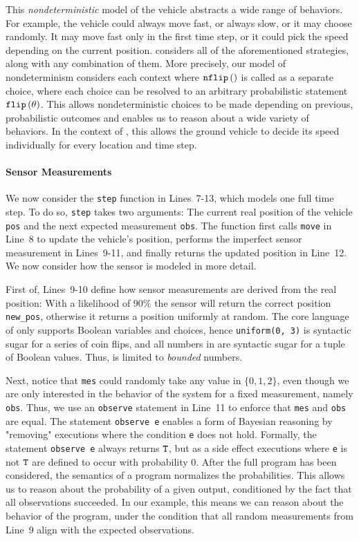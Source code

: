 This \textit{nondeterministic} model of the vehicle abstracts a wide range of behaviors.
For example, the vehicle could always move fast, or always slow, or it may choose randomly.
It may move fast only in the first time step, or it could pick the speed depending on the current position. 
\NDICE considers all of the aforementioned strategies, along with any combination of them. 
More precisely, our model of nondeterminism considers each context where $\texttt{nflip}\left(\right) $ is called as a separate choice, where each choice can be resolved to an arbitrary probabilistic statement $\texttt{flip} \left(\theta\right) $.
This allows nondeterministic choices to be made depending on previous, probabilistic outcomes and enables us to reason about a wide variety of behaviors.
In the context of , this allows the ground vehicle to decide its speed individually for every location and time step.



\paragraph{Sensor Measurements}
We now consider the \texttt{step} function in Lines~7-13, which models one full time step.
To do so, \texttt{step} takes two arguments: The current real position of the vehicle \texttt{pos} and the next expected measurement \texttt{obs}.
The function first calls \texttt{move} in Line~8 to update the vehicle's position, performs the imperfect sensor measurement in Lines~9-11, and finally returns the updated position in Line~12. 
We now consider how the sensor is modeled in more detail.

First of, Lines~9-10 define how sensor measurements are derived from the real position:
With a likelihood of $90\%$ the sensor will return the correct position \texttt{new\_pos}, otherwise it returns a position uniformly at random. 
The core language of \NDICE only supports Boolean variables and choices, hence \texttt{uniform(0, 3)} is syntactic sugar for a series of coin flips, and all numbers in  are syntactic sugar for a tuple of Boolean values.
Thus, \NDICE is limited to \emph{bounded} numbers.

Next, notice that \texttt{mes} could randomly take any value in $\{0,1,2\}$, even though we are only interested in the behavior of the system for a fixed measurement, namely \texttt{obs}.
Thus, we use an \verb*|observe| statement in Line~11 to enforce that \texttt{mes} and \texttt{obs} are equal.
The statement \verb|observe e| enables a form of Bayesian reasoning by "removing" executions where the condition \verb*|e| does not hold.
Formally, the statement \verb|observe e| always returns $\texttt{T}$, but as a side effect executions where \verb*|e| is not $\texttt{T}$ are defined to occur with probability $0$.
After the full program has been considered, the semantics of a \NDICE program normalizes the probabilities.
This allows us to reason about the probability of a given output, conditioned by the fact that all observations succeeded.
In our example, this means we can reason about the behavior of the program, under the condition that all random measurements from Line~9 align with the expected observations.


